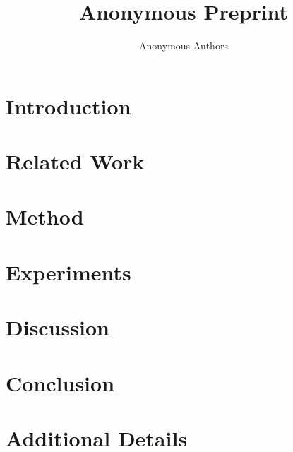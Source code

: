 \documentclass[11pt]{article}
\title{Anonymous Preprint}
\author{Anonymous Authors}
\date{}
\begin{document}
\maketitle

\begin{abstract}
\end{abstract}

\section{Introduction}
\label{sec:intro}

\section{Related Work}
\label{sec:related_work}

\section{Method}
\label{sec:method}

\section{Experiments}
\label{sec:experiments}

\section{Discussion}
\label{sec:discussion}

\section{Conclusion}
\label{sec:conclusion}




\appendix
\section{Additional Details}
\label{app:details}
\end{document}
